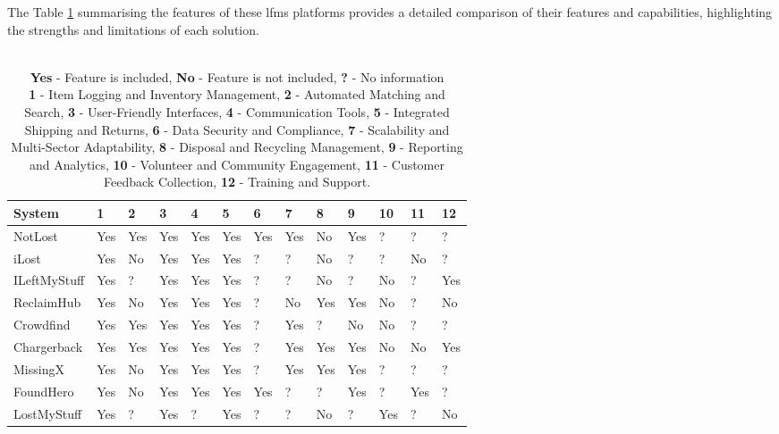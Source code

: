 The Table \ref{tab:lfms_features} summarising the features of these \ac{lfms} platforms provides a detailed comparison of their features and capabilities, highlighting the strengths and limitations of each solution.

\begin{table}[!htb]
    \centering
    \caption{Feature Availability in \aclp{lfms}}
    \begin{tabular}{lllllllllllll}
        \toprule
        \textbf{System} & 1 & 2 & 3 & 4 & 5 & 6 & 7 & 8 & 9 & 10 & 11 & 12 \\
        \midrule
        NotLost & Yes & Yes & Yes & Yes & Yes & Yes & Yes & No & Yes & ? & ? & ? \\
        iLost & Yes & No & Yes & Yes & Yes & ? & ? & No & ? & ? & No & ? \\
        ILeftMyStuff & Yes & ? & Yes & Yes & Yes & ? & ? & No & ? & No & ? & Yes \\
        ReclaimHub & Yes & No & Yes & Yes & Yes & ? & No & Yes & Yes & No & ? & No \\
        Crowdfind & Yes & Yes & Yes & Yes & Yes & ? & Yes & ? & No & No & ? & ? \\
        Chargerback & Yes & Yes & Yes & Yes & Yes & ? & Yes & Yes & Yes & No & No & Yes \\
        MissingX & Yes & No & Yes & Yes & Yes & ? & Yes & Yes & Yes & ? & ? & ? \\
        FoundHero & Yes & No & Yes & Yes & Yes & Yes & ? & ? & Yes & ? & Yes & ? \\
        LostMyStuff & Yes & ? & Yes & ? & Yes & ? & ? & No & ? & Yes & ? & No \\
        \bottomrule
    \end{tabular}
    \caption*{\\\textbf{Yes} - Feature is included, \textbf{No} - Feature is not included, \textbf{?} - No information\\\textbf{1} - Item Logging and Inventory Management, \textbf{2} - Automated Matching and Search, \textbf{3} - User-Friendly Interfaces, \textbf{4} - Communication Tools, \textbf{5} - Integrated Shipping and Returns, \textbf{6} - Data Security and Compliance, \textbf{7} - Scalability and Multi-Sector Adaptability, \textbf{8} - Disposal and Recycling Management, \textbf{9} - Reporting and Analytics, \textbf{10} - Volunteer and Community Engagement, \textbf{11} - Customer Feedback Collection, \textbf{12} - Training and Support.}
    \label{tab:lfms_features}
\end{table}

